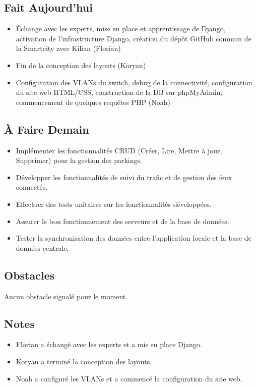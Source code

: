 \documentclass[a4paper,12pt]{report}
\begin{document}
\subsection{Fait Aujourd'hui}
\begin{itemize}
    \item Échange avec les experts, mise en place et apprentissage de Django, activation de l'infrastructure Django, création du dépôt GitHub commun de la Smartcity avec Kilian (Florian)
    \item Fin de la conception des layouts (Koryan)
    \item Configuration des VLANs du switch, debug de la connectivité, configuration du site web HTML/CSS, construction de la DB sur phpMyAdmin, commencement de quelques requêtes PHP (Noah)
\end{itemize}

\subsection{À Faire Demain}
\begin{itemize}
    \item Implémenter les fonctionnalités CRUD (Créer, Lire, Mettre à jour, Supprimer) pour la gestion des parkings.
    \item Développer les fonctionnalités de suivi du trafic et de gestion des feux connectés.
    \item Effectuer des tests unitaires sur les fonctionnalités développées.
    \item Assurer le bon fonctionnement des serveurs et de la base de données.
    \item Tester la synchronisation des données entre l'application locale et la base de données centrale.
\end{itemize}

\subsection{Obstacles}
Aucun obstacle signalé pour le moment.

\subsection{Notes}
\begin{itemize}
    \item Florian a échangé avec les experts et a mis en place Django.
    \item Koryan a terminé la conception des layouts.
    \item Noah a configuré les VLANs et a commencé la configuration du site web.
\end{itemize}
\end{document}
